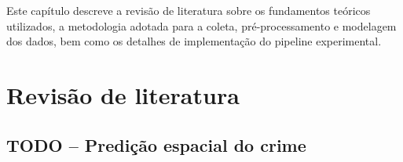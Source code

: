 
\label{Cap:desenvolvimento}

Este capítulo descreve a revisão de literatura sobre os fundamentos teóricos utilizados, a metodologia adotada para a coleta, pré-processamento e modelagem dos dados, bem como os detalhes de implementação do pipeline experimental.

\section{Revisão de literatura}
\label{Sec:revisaoliteratura}

\subsection{TODO -- Predição espacial do crime}
\label{Sec:todo_crime_prediction}

%
%
%
%

